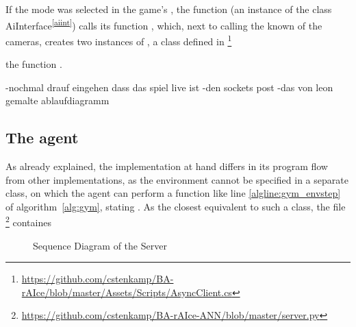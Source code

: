 If the  mode was selected in the game's , the function  (an instance of the class AiInterface\textsuperscript{\ref{aiint}}) calls 
its function , which, next to calling the known  of the cameras, creates two instances of , a class defined in \footnote{\url{https://github.com/cstenkamp/BA-rAIce/blob/master/Assets/Scripts/AsyncClient.cs}}

the function .




-nochmal drauf eingehen dass das spiel live ist
-den sockets post
-das von leon gemalte ablaufdiagramm


\subsection{The agent}

As already explained, the implementation at hand differs in its program flow from other implementations, as the environment cannot be specified in a separate class, on which the agent can perform a function like line \ref{algline:gym_envstep} of algorithm~\ref{alg:gym}, stating . As the closest equivalent to such a class, the file  \footnote{\url{https://github.com/cstenkamp/BA-rAIce-ANN/blob/master/server.py}} containes 


\begin{figure}[h]
	\centering
	\resizebox{1.1\textwidth}{!}{
		
	}
	\caption{Sequence Diagram of the Server}
	\label{fig:sequenceserver}
\end{figure}



